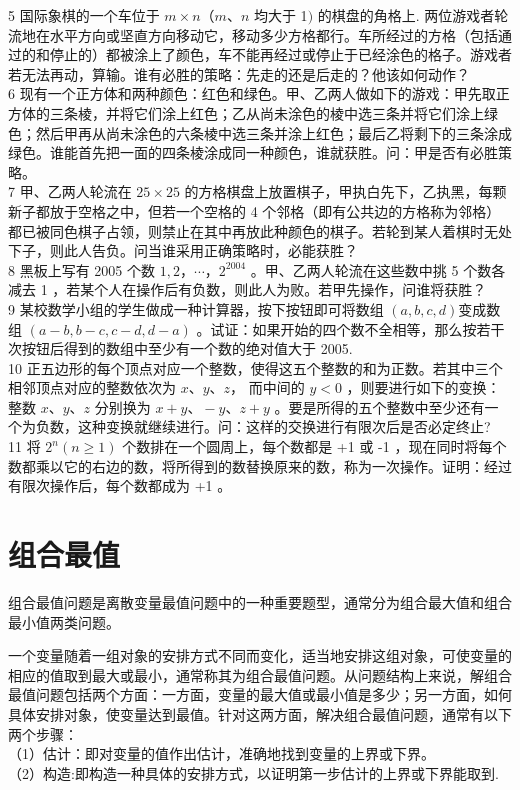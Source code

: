 \documentclass[10pt]{article}
\begin{document}
5 国际象棋的一个车位于 $m \times n （ m 、 n$ 均大于 1$)$ 的棋盘的角格上. 两位游戏者轮流地在水平方向或坚直方向移动它，移动多少方格都行。车所经过的方格（包括通过的和停止的）都被涂上了颜色，车不能再经过或停止于已经涂色的格子。游戏者若无法再动，算输。谁有必胜的策略：先走的还是后走的？他该如何动作？\\
6 现有一个正方体和两种颜色：红色和绿色。甲、乙两人做如下的游戏：甲先取正方体的三条棱，并将它们涂上红色；乙从尚未涂色的棱中选三条并将它们涂上绿色；然后甲再从尚未涂色的六条棱中选三条并涂上红色；最后乙将剩下的三条涂成绿色。谁能首先把一面的四条棱涂成同一种颜色，谁就获胜。问：甲是否有必胜策略。\\
7 甲、乙两人轮流在 $25 \times 25$ 的方格棋盘上放置棋子，甲执白先下，乙执黑，每颗新子都放于空格之中，但若一个空格的 4 个邻格（即有公共边的方格称为邻格）都已被同色棋子占领，则禁止在其中再放此种颜色的棋子。若轮到某人着棋时无处下子，则此人告负。问当谁采用正确策略时，必能获胜？\\
8 黑板上写有 2005 个数 $1,2 ， \cdots ， 2^{2004}$ 。甲、乙两人轮流在这些数中挑 5 个数各减去 1 ，若某个人在操作后有负数，则此人为败。若甲先操作，问谁将获胜？\\
9 某校数学小组的学生做成一种计算器，按下按钮即可将数组 $(a, b, c, d)$变成数组 $(a-b, b-c, c-d, d-a)$ 。试证：如果开始的四个数不全相等，那么按若干次按钮后得到的数组中至少有一个数的绝对值大于 2005.\\
10 正五边形的每个顶点对应一个整数，使得这五个整数的和为正数。若其中三个相邻顶点对应的整数依次为 $x 、 y 、 z ，$ 而中间的 $y<0$ ，则要进行如下的变换：整数 $x 、 y 、 z$ 分别换为 $x+y 、-y 、 z+y$ 。要是所得的五个整数中至少还有一个为负数，这种变换就继续进行。问：这样的交换进行有限次后是否必定终止?\\
11 将 $2^{n}(n \geqslant 1)$ 个数排在一个圆周上，每个数都是 +1 或 -1 ，现在同时将每个数都乘以它的右边的数，将所得到的数替换原来的数，称为一次操作。证明：经过有限次操作后，每个数都成为 +1 。

\section{组合最值}
组合最值问题是离散变量最值问题中的一种重要题型，通常分为组合最大值和组合最小值两类问题。

一个变量随着一组对象的安排方式不同而变化，适当地安排这组对象，可使变量的相应的值取到最大或最小，通常称其为组合最值问题。从问题结构上来说，解组合最值问题包括两个方面：一方面，变量的最大值或最小值是多少；另一方面，如何具体安排对象，使变量达到最值。针对这两方面，解决组合最值问题，通常有以下两个步骤：\\
（1）估计：即对变量的值作出估计，准确地找到变量的上界或下界。\\
（2）构造:即构造一种具体的安排方式，以证明第一步估计的上界或下界能取到.
\end{document}
